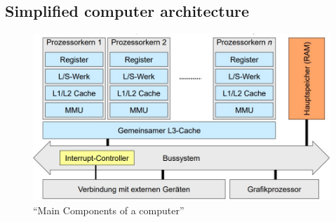 \documentclass[
]{article}
\begin{document}
\hypertarget{simplified-computer-architecture}{%
\subsection{Simplified computer
architecture}\label{simplified-computer-architecture}}

\begin{figure}
\centering
\includegraphics{images/Computer_Arch_Simplified.jpg}
\caption{``Main Components of a computer''}
\end{figure}
\end{document}
